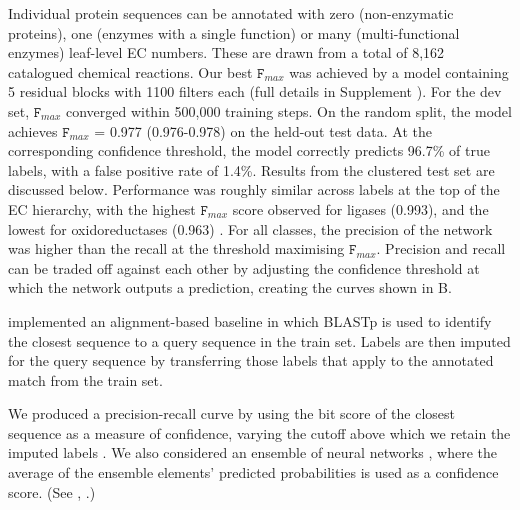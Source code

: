 Individual protein sequences can be annotated with zero (non-enzymatic proteins), one (enzymes with a single function) or many (multi-functional enzymes) leaf-level EC numbers. These are drawn from a total of 8,162 catalogued chemical reactions.
Our best $\texttt{F}_{max}$ was achieved by a model containing 5 residual blocks with 1100 filters each (full details in \textnormal{ Supplement}%
). For the dev set, $\texttt{F}_{max}$ converged within 500,000 training steps. On the random split, the model achieves $\texttt{F}_{max}$ = 0.977 (0.976-0.978) on the held-out test data. At the corresponding confidence threshold, the model correctly predicts 96.7\% of true labels, with a false positive rate of 1.4\%. Results from the clustered test set are discussed below.
Performance was roughly similar across labels at the top of the EC hierarchy, with the highest $\texttt{F}_{max}$ score observed for ligases (0.993), and the lowest for oxidoreductases (0.963)\DIFdelbegin \DIFdel{(}%
\DIFdelend . For all classes, the precision of the network was higher than the recall at the threshold maximising $\texttt{F}_{max}$. Precision and recall can be traded off against each other by adjusting the confidence threshold at which the network outputs a prediction, creating the curves shown in B.%


\DIFdelbegin {}\DIFdelend \DIFaddbegin {}\DIFaddend implemented an alignment-based baseline in which BLASTp is used to identify the closest sequence to a query sequence in the train set. Labels are then imputed for the query sequence by transferring those labels that apply to the annotated match from the train set. \DIFdelbegin %

\DIFdelend We produced a precision-recall curve by using the bit score of the closest sequence as a measure of confidence, varying the cutoff above which we retain the imputed labels \cite{zhou2019cafa, eddy2011accelerated}. We also considered an ensemble of neural networks \cite{bileschi}, where the average of the ensemble elements' predicted probabilities is used as a confidence score\DIFaddbegin {}\DIFaddend . %
(See \DIFaddbegin {}\DIFaddend {}, .)

